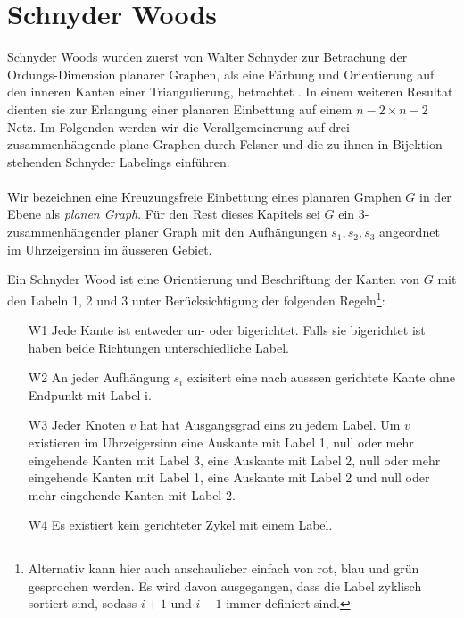 \section{Schnyder Woods}\label{sw}
Schnyder Woods wurden zuerst von Walter Schnyder zur Betrachung der Ordungs-Dimension planarer Graphen, als eine Färbung und Orientierung auf den inneren Kanten einer Triangulierung, betrachtet \cite{schnyder89}. In einem weiteren Resultat dienten sie zur Erlangung einer planaren Einbettung auf einem $n-2 \times n-2$ Netz\cite{schnyder90}. Im Folgenden werden wir die Verallgemeinerung auf drei-zusammenhängende plane Graphen durch Felsner \cite{felsner01} und die zu ihnen in Bijektion stehenden Schnyder Labelings einführen.\\
\\
Wir bezeichnen eine Kreuzungsfreie Einbettung eines planaren Graphen $G$ in der Ebene als \textit{planen Graph}. Für den Rest dieses Kapitels sei $G$ ein 3-zusammenhängender planer Graph mit den Aufhängungen $s_1,s_2,s_3$ angeordnet im Uhrzeigersinn im äusseren Gebiet. \\
\begin{definition}
Ein Schnyder Wood ist eine Orientierung und Beschriftung der Kanten von $G$ mit den Labeln 1, 2 und 3 unter Berücksichtigung der folgenden Regeln\footnote{Alternativ kann hier auch anschaulicher einfach von rot, blau und grün gesprochen werden. Es wird davon ausgegangen, dass die Label zyklisch sortiert sind, sodass $i+1$ und $i-1$ immer definiert sind.}:
\begin{itemize}
\item[W1] Jede Kante ist entweder un- oder bigerichtet. Falls sie bigerichtet ist haben beide Richtungen unterschiedliche Label.
\item[W2] An jeder Aufhängung  $s_i$ exisitert eine nach ausssen gerichtete Kante ohne Endpunkt mit Label i.  
\item[W3] Jeder Knoten $v$ hat hat Ausgangsgrad eins zu jedem Label. Um $v$ existieren im Uhrzeigersinn eine Auskante mit Label 1, null oder mehr eingehende Kanten mit Label 3, eine Auskante mit Label 2, null oder mehr  eingehende Kanten mit Label 1, eine Auskante mit Label 2 und null oder mehr  eingehende Kanten mit Label 2.
\item[W4] Es existiert kein gerichteter Zykel mit einem Label. 
\end{itemize}

\end{definition}

